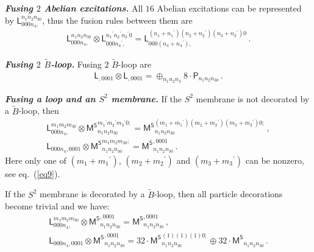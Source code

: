 \documentclass[11pt,nofootinbib,preprint]{revtex4-1}
\begin{document}
\textbf{\textit{Fusing $2$ Abelian excitations.}}
All $16$ Abelian excitations can be represented by $\mathsf{L}_{000n_4,}^{n_1n_2n_30}$, thus the fusion rules between them are 
\begin{align}
	\mathsf{L}_{000n_4,}^{n_1n_2n_30}\otimes \mathsf{L}_{000{n_4}^{\prime},}^{{n_1}^{\prime}{n_2}^{\prime}{n_3}^{\prime}0}=\mathsf{L}_{000\left( n_4+{n_4}^{\prime} \right),}^{\left( n_1+{n_1}^{\prime} \right) \left( n_2+{n_2}^{\prime} \right) \left( n_3+{n_3}^{\prime} \right) 0}\,.
\end{align}

\textbf{\textit{Fusing $2$ $\tilde{B}$-loop.}}
Fusing $2$ $\tilde{B}$-loop are
\begin{align}
	\mathsf{L}_{,0001}\otimes \mathsf{L}_{,0001}=\oplus _{n_1n_2n_3}8\cdot \mathsf{P}_{n_1n_2n_30}\,.
\end{align}

\textbf{\textit{Fusing a loop and an $S^2$ membrane.}}
If the $S^2$ membrane is not decorated by a $\tilde{B}$-loop, then
\begin{gather}
	\mathsf{L}_{000n_4,}^{m_1m_2m_30}\otimes {\mathsf{M}^{\mathsf{S}}}_{n_1n_2n_30}^{{m_1}^{\prime}{m_2}^{\prime}{m_3}^{\prime}0;}={\mathsf{M}^{\mathsf{S}}}_{n_1n_2n_30}^{\left( m_1+{m_1}^{\prime} \right) \left( m_2+{m_2}^{\prime} \right) \left( m_3+{m_3}^{\prime} \right) 0;}\,,
	\\
	\mathsf{L}_{000n_4,0001}\otimes {\mathsf{M}^{\mathsf{S}}}_{n_1n_2n_30}^{m_1m_2m_30;}={\mathsf{M}^{\mathsf{S}}}_{n_1n_2n_30}^{,0001}\,.
\end{gather}
Here only one of $\left( m_1+{m_1}^{\prime} \right)$, $\left( m_2+{m_2}^{\prime} \right)$ and $\left( m_3+{m_3}^{\prime} \right)$ can be nonzero, see  eq.~(\ref{eq9}).

If the $S^2$ membrane is decorated by a $\tilde{B}$-loop, then all particle decorations become trivial and we have:
\begin{gather}
	\mathsf{L}_{000n_4,}^{m_1m_2m_30}\otimes {\mathsf{M}^{\mathsf{S}}}_{n_1n_2n_30}^{,0001}={\mathsf{M}^{\mathsf{S}}}_{n_1n_2n_30}^{,0001}\,,
	\\
	\mathsf{L}_{000n_4,0001}\otimes {\mathsf{M}^{\mathsf{S}}}_{n_1n_2n_30}^{,0001}=32\cdot {\mathsf{M}^{\mathsf{S}}}_{n_1n_2n_30}^{\left( 1 \right) \left( 1 \right) \left( 1 \right) 0;}\oplus 32\cdot {\mathsf{M}^{\mathsf{S}}}_{n_1n_2n_30}\,.
\end{gather}
\end{document}

